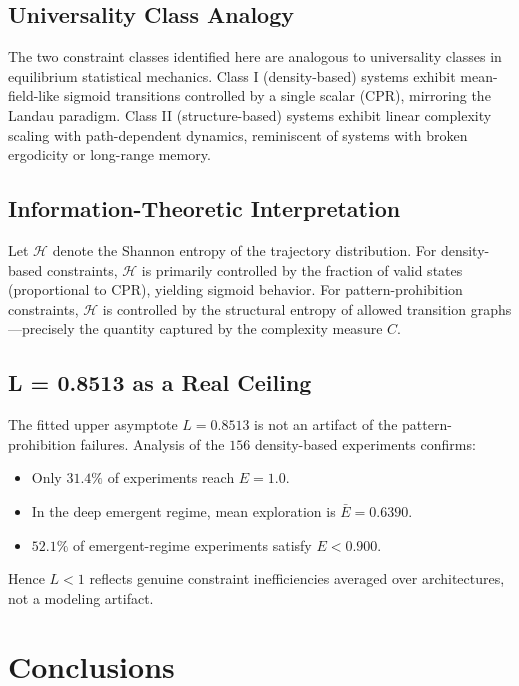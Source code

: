 \documentclass[12pt,a4paper]{article}
\begin{document}
\subsection{Universality Class Analogy}

The two constraint classes identified here are analogous to universality classes in equilibrium statistical mechanics. Class I (density-based) systems exhibit mean-field-like sigmoid transitions controlled by a single scalar (CPR), mirroring the Landau paradigm. Class II (structure-based) systems exhibit linear complexity scaling with path-dependent dynamics, reminiscent of systems with broken ergodicity or long-range memory.

\subsection{Information-Theoretic Interpretation}

Let $\mathcal{H}$ denote the Shannon entropy of the trajectory distribution. For density-based constraints, $\mathcal{H}$ is primarily controlled by the fraction of valid states (proportional to CPR), yielding sigmoid behavior. For pattern-prohibition constraints, $\mathcal{H}$ is controlled by the structural entropy of allowed transition graphs---precisely the quantity captured by the complexity measure $C$.

\subsection{L = 0.8513 as a Real Ceiling}

The fitted upper asymptote $L = 0.8513$ is not an artifact of the pattern-prohibition failures. Analysis of the $156$ density-based experiments confirms:
\begin{itemize}
    \item Only $31.4\%$ of experiments reach $E=1.0$.
    \item In the deep emergent regime, mean exploration is $\bar{E} = 0.6390$.
    \item $52.1\%$ of emergent-regime experiments satisfy $E < 0.900$.
\end{itemize}
Hence $L < 1$ reflects genuine constraint inefficiencies averaged over architectures, not a modeling artifact.

\section{Conclusions}
\end{document}
